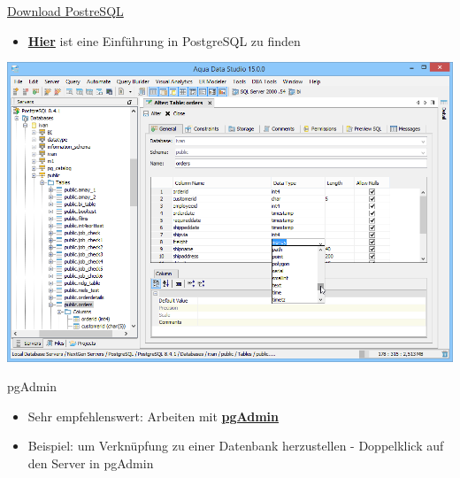 \documentclass[ignorenonframetext,]{beamer}
\providecommand{\tightlist}{%
  \setlength{\itemsep}{0pt}\setlength{\parskip}{0pt}}
\begin{document}
\begin{frame}{\href{http://www.postgresql.org/download/windows/}{Download
PostreSQL}}
\protect\hypertarget{download-postresql}{}

\begin{itemize}
\tightlist
\item
  \href{https://datashenanigan.wordpress.com/2015/05/18/getting-started-with-postgresql-in-r/}{\textbf{Hier}}
  ist eine Einführung in PostgreSQL zu finden
\end{itemize}

\includegraphics{figure/aquadatastudio_postgresql_visual_table_editing.png}

\end{frame}

\begin{frame}{pgAdmin}
\protect\hypertarget{pgadmin}{}

\begin{itemize}
\tightlist
\item
  Sehr empfehlenswert: Arbeiten mit
  \href{https://www.pgadmin.org/}{\textbf{pgAdmin}}
\item
  Beispiel: um Verknüpfung zu einer Datenbank herzustellen - Doppelklick
  auf den Server in pgAdmin
\end{itemize}

\end{frame}
\end{document}
